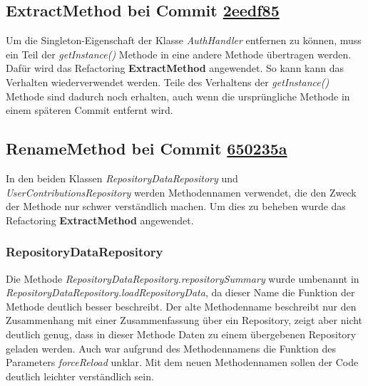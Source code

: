 \subsection{ExtractMethod bei Commit \href{https://github.com/lukaspanni/OpenSourceStats/commit/2eedf85be90e2566aa3811f9ccd3bac860c444a2} {2eedf85}}
\label{sec:ExtractMethod_AuthHandler}

Um die Singleton-Eigenschaft der Klasse \textit{AuthHandler} entfernen zu können, muss ein Teil der \textit{getInstance()} Methode in eine andere Methode übertragen werden.
Dafür wird das Refactoring \textbf{ExtractMethod} angewendet. So kann kann das Verhalten wiederverwendet werden. Teile des Verhaltens der \textit{getInstance()} Methode sind dadurch noch erhalten, auch wenn die ursprüngliche Methode in einem späteren Commit entfernt wird.


\subsection{RenameMethod bei Commit \href{https://github.com/lukaspanni/OpenSourceStats/commit/650235a5868f35cd0c641f0112b921ddead17a17} {650235a}}
\label{sec:RenameMethod_Repositories}

In den beiden Klassen \textit{RepositoryDataRepository} und \textit{UserContributionsRepository} werden Methodennamen verwendet, die den Zweck der Methode nur schwer verständlich machen. Um dies zu beheben wurde das Refactoring \textbf{ExtractMethod} angewendet.
\subsubsection*{RepositoryDataRepository}
Die Methode \textit{RepositoryDataRepository.repositorySummary} wurde umbenannt in \textit{RepositoryDataRepository.loadRepositoryData}, da dieser Name die Funktion der Methode deutlich besser beschreibt. Der alte Methodenname beschreibt nur den Zusammenhang mit einer Zusammenfassung über ein Repository, zeigt aber nicht deutlich genug, dass in dieser Methode Daten zu einem übergebenen Repository geladen werden. Auch war aufgrund des Methodennamens die Funktion des Parameters \textit{forceReload} unklar.
Mit dem neuen Methodennamen sollen der Code deutlich leichter verständlich sein.
